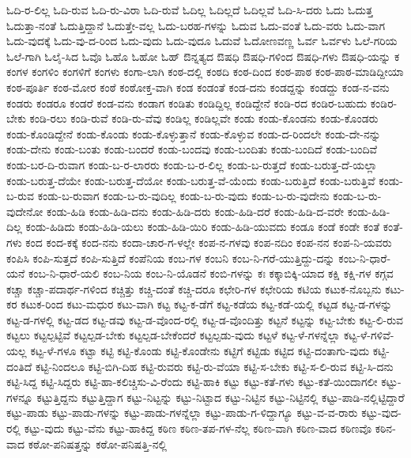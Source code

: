 {ಓದಿ-ರ-ಲಿಲ್ಲ
ಓದಿ-ರುವ
ಓದಿ-ರು-ವಿರಾ
ಓದಿ-ರುವೆ
ಓದಿಲ್ಲ
ಓದಿಲ್ಲದೆ
ಓದಿಲ್ಲವೆ
ಓದಿ-ಸಿ-ದರು
ಓದು
ಓದುತ್ತ
ಓದುತ್ತಾ-ನಂತೆ
ಓದುತ್ತಿದ್ದಾನೆ
ಓದುತ್ತೇ-ವಲ್ಲ
ಓದು-ಬರಹ-ಗಳನ್ನು
ಓದುವ
ಓದು-ವಂತೆ
ಓದು-ವರು
ಓದು-ವಾಗ
ಓದು-ವುದಕ್ಕೆ
ಓದು-ವು-ದ-ರಿಂದ
ಓದು-ವುದು
ಓದು-ವುದೂ
ಓದುವೆ
ಓದೋಣವಣ್ಣ
ಓರ್ವ
ಓರ್ವಳು
ಓಲೆ-ಗರಿಯ
ಓಲೆ-ಗಾಗಿ
ಓಲೈ-ಸಿದ
ಓವೊ
ಓಹೊ
ಓಹೋ
ಓಹ್
ಔನ್ನತ್ಯದ
ಔಷಧಿ
ಔಷಧಿ-ಗಳಿಂದ
ಔಷಧಿ-ಗಳು
ಔಷಧಿ-ಯನ್ನು
ಕ
ಕಂಗಳ
ಕಂಗಳಿಂ
ಕಂಗಳಿಗೆ
ಕಂಗಳು
ಕಂಗಾ-ಲಾಗಿ
ಕಂಠ-ದಲ್ಲಿ
ಕಂಠದಿ
ಕಂಠ-ದಿಂದ
ಕಂಠ-ಪಾಠ
ಕಂಠ-ಪಾಠ-ಮಾಡಿದ್ದೀಯಾ
ಕಂಠ-ಪೂರ್ತಿ
ಕಂಠ-ಮೋರ
ಕಂಠೆ
ಕಂಠೋಕ್ತ-ವಾಗಿ
ಕಂಡ
ಕಂಡಂತೆ
ಕಂಡ-ದನು
ಕಂಡದ್ದನ್ನು
ಕಂಡದ್ದು
ಕಂಡ-ನ-ವನು
ಕಂಡರು
ಕಂಡರೂ
ಕಂಡರೆ
ಕಂಡ-ವನು
ಕಂಡಾಗ
ಕಂಡಿತು
ಕಂಡಿದ್ದಿಲ್ಲ
ಕಂಡಿದ್ದೇನೆ
ಕಂಡಿ-ರದ
ಕಂಡಿರ-ಬಹುದು
ಕಂಡಿರ-ಬೇಕು
ಕಂಡಿ-ರಲು
ಕಂಡಿ-ರುವೆ
ಕಂಡಿ-ರು-ವೆವು
ಕಂಡಿಲ್ಲ
ಕಂಡಿಲ್ಲವೇ
ಕಂಡು
ಕಂಡು-ಕೊಂಡನು
ಕಂಡು-ಕೊಂಡರು
ಕಂಡು-ಕೊಂಡಿದ್ದೇನೆ
ಕಂಡು-ಕೊಂಡು
ಕಂಡು-ಕೊಳ್ಳುತ್ತಾನೆ
ಕಂಡು-ಕೊಳ್ಳುವ
ಕಂಡು-ದ-ರಿಂದಲೇ
ಕಂಡು-ದೇ-ನನ್ನು
ಕಂಡು-ದೇನು
ಕಂಡು-ಬಂತು
ಕಂಡು-ಬಂದರೆ
ಕಂಡು-ಬಂದವು
ಕಂಡು-ಬಂದಿತು
ಕಂಡು-ಬಂದಿದೆ
ಕಂಡು-ಬಂದಿವೆ
ಕಂಡು-ಬರ-ದಿ-ರುವಾಗ
ಕಂಡು-ಬ-ರ-ಲಾರರು
ಕಂಡು-ಬ-ರ-ಲಿಲ್ಲ
ಕಂಡು-ಬ-ರುತ್ತದೆ
ಕಂಡು-ಬರುತ್ತ-ದೆ-ಯಲ್ಲಾ
ಕಂಡು-ಬರುತ್ತ-ದೆಯೇ
ಕಂಡು-ಬರುತ್ತ-ದೆಯೋ
ಕಂಡು-ಬರುತ್ತ-ವೆ-ಯೆಂದು
ಕಂಡು-ಬರುತ್ತಿದೆ
ಕಂಡು-ಬರುತ್ತಿವೆ
ಕಂಡು-ಬ-ರುವ
ಕಂಡು-ಬ-ರುವಾಗ
ಕಂಡು-ಬ-ರು-ವುದಿಲ್ಲ
ಕಂಡು-ಬ-ರು-ವುದು
ಕಂಡು-ಬ-ರು-ವುದೇನು
ಕಂಡು-ಬ-ರು-ವುದೇನೋ
ಕಂಡು-ಹಿಡಿ
ಕಂಡು-ಹಿಡಿ-ದನು
ಕಂಡು-ಹಿಡಿ-ದರು
ಕಂಡು-ಹಿಡಿ-ದರೆ
ಕಂಡು-ಹಿಡಿ-ದ-ವರೇ
ಕಂಡು-ಹಿಡಿ-ದಿಲ್ಲ
ಕಂಡು-ಹಿಡಿದು
ಕಂಡು-ಹಿಡಿ-ಯಲು
ಕಂಡು-ಹಿಡಿ-ಯಿರಿ
ಕಂಡು-ಹಿಡಿ-ಯುವದು
ಕಂಡೂ
ಕಂಡೆ
ಕಂಡೇ
ಕಂತೆ
ಕಂತೆ-ಗಳು
ಕಂದ
ಕಂದ-ಕಕ್ಕೆ
ಕಂದ-ನನು
ಕಂದಾ-ಚಾರ-ಗ-ಳಲ್ಲೇ
ಕಂಪ-ನ-ಗಳವು
ಕಂಪ-ನದಿಂ
ಕಂಪ-ನನ
ಕಂಪ-ನಿ-ಯವರು
ಕಂಪಿಸಿ
ಕಂಪಿ-ಸುತ್ತದೆ
ಕಂಪಿ-ಸುತ್ತಿದೆ
ಕಂಪೆನಿಯ
ಕಂಬ-ಗಳ
ಕಂಬನಿ
ಕಂಬ-ನಿ-ಗರೆ-ಯುತ್ತಿದ್ದು-ದನ್ನು
ಕಂಬ-ನಿ-ಧಾರೆ-ಯನೆ
ಕಂಬ-ನಿ-ಧಾರೆ-ಯಲಿ
ಕಂಬ-ನಿಯ
ಕಂಬ-ನಿ-ಯೊಡನೆ
ಕಂಬಿ-ಗಳನ್ನು
ಕಃ
ಕಕ್ಕಾಬಿಕ್ಕಿ-ಯಾದ
ಕಕ್ಷಿ
ಕಕ್ಷಿ-ಗಳ
ಕಗ್ಗವ
ಕಚ್ಚಾ
ಕಚ್ಚಾ-ಪದಾರ್ಥ-ಗಳಿಂದ
ಕಚ್ಚಿತ್ತು
ಕಚ್ಚಿ-ದಂತೆ
ಕಚ್ಚಿ-ದರೂ
ಕಛೇರಿ-ಗಳ
ಕಛೇರಿಯ
ಕಟಿಯ
ಕಟುಕ-ನೊಬ್ಬನು
ಕಟು-ಕರ
ಕಟುಕ-ರಿಂದ
ಕಟು-ಮಧುರ
ಕಟು-ವಾಗಿ
ಕಟ್ಟ
ಕಟ್ಟ-ಕ-ಡೆಗೆ
ಕಟ್ಟ-ಕಡೆಯ
ಕಟ್ಟ-ಕಡೆ-ಯಲ್ಲಿ
ಕಟ್ಟಡ
ಕಟ್ಟ-ಡ-ಗಳನ್ನು
ಕಟ್ಟ-ಡ-ಗಳಲ್ಲಿ
ಕಟ್ಟ-ಡದ
ಕಟ್ಟ-ಡವು
ಕಟ್ಟ-ಡ-ವೊಂದ-ರಲ್ಲಿ
ಕಟ್ಟ-ಡ-ವೊಂದಿತ್ತು
ಕಟ್ಟನೆ
ಕಟ್ಟನ್ನು
ಕಟ್ಟ-ಬೇಕು
ಕಟ್ಟ-ಲಿ-ರುವ
ಕಟ್ಟಲು
ಕಟ್ಟಲ್ಪಟ್ಟಿವೆ
ಕಟ್ಟಲ್ಪಡ-ಬೇಕು
ಕಟ್ಟಲ್ಪಡ-ಬೇಕೆಂದರೆ
ಕಟ್ಟಲ್ಪಡು-ವುದು
ಕಟ್ಟಳೆ
ಕಟ್ಟ-ಳೆ-ಗಳನ್ನೆಲ್ಲಾ
ಕಟ್ಟ-ಳೆ-ಗಳಿವೆ-ಯಲ್ಲ
ಕಟ್ಟ-ಳೆ-ಗಳೂ
ಕಟ್ಟಾ
ಕಟ್ಟಿ
ಕಟ್ಟಿ-ಕೊಂಡು
ಕಟ್ಟಿ-ಕೊಂಡೇನು
ಕಟ್ಟಿಗೆ
ಕಟ್ಟಿಡು
ಕಟ್ಟಿದ
ಕಟ್ಟಿ-ದಂತಾಗು-ವುದು
ಕಟ್ಟಿ-ದಂತಿದೆ
ಕಟ್ಟಿ-ನಿಂದಲೂ
ಕಟ್ಟಿ-ಬಿಗಿ-ದಿಹ
ಕಟ್ಟಿ-ರುವರು
ಕಟ್ಟಿ-ರು-ವೆಯಾ
ಕಟ್ಟಿ-ಸ-ಬೇಕು
ಕಟ್ಟಿ-ಸ-ಲಿ-ರುವ
ಕಟ್ಟಿ-ಸಿ-ದನು
ಕಟ್ಟಿ-ಸಿದ್ದ
ಕಟ್ಟಿ-ಸಿದ್ದರು
ಕಟ್ಟಿ-ಹಾ-ಕಲಿಚ್ಚಿಸು-ವಿ-ರೆಂದು
ಕಟ್ಟಿ-ಹಾಕಿ
ಕಟ್ಟು
ಕಟ್ಟು-ಕತೆ-ಗಳು
ಕಟ್ಟು-ಕತೆ-ಯಿಂದಾಗಲೀ
ಕಟ್ಟು-ಗಳನ್ನೂ
ಕಟ್ಟುತ್ತಿದ್ದನು
ಕಟ್ಟುತ್ತಿದ್ದಾಗ
ಕಟ್ಟು-ನಿಟ್ಟನ್ನು
ಕಟ್ಟು-ನಿಟ್ಟಾದ
ಕಟ್ಟು-ನಿಟ್ಟಿನ
ಕಟ್ಟು-ನಿಟ್ಟಿನಲ್ಲಿ
ಕಟ್ಟು-ಪಾಡಿ-ನಲ್ಲಿಟ್ಟಿದ್ದಾರೆ
ಕಟ್ಟು-ಪಾಡು
ಕಟ್ಟು-ಪಾಡು-ಗಳನ್ನು
ಕಟ್ಟು-ಪಾಡು-ಗಳನ್ನೆಲ್ಲಾ
ಕಟ್ಟು-ಪಾಡು-ಗ-ಳಿದ್ದಾಗ್ಯೂ
ಕಟ್ಟು-ವ-ವ-ರಾರು
ಕಟ್ಟು-ವುದ-ರಲ್ಲಿ
ಕಟ್ಟು-ವುದು
ಕಟ್ಟು-ವೆನು
ಕಟ್ಟು-ಹಾಕಿದ್ದ
ಕಠಿಣ
ಕಠಿಣ-ತಪ-ಗಳ-ನೆಲ್ಲ
ಕಠಿಣ-ವಾಗಿ
ಕಠಿಣ-ವಾದ
ಕಠಿಣವೊ
ಕಠಿನ-ವಾದ
ಕಠೋ-ಪನಿಷತ್ತನ್ನು
ಕಠೋ-ಪನಿಷತ್ತಿ-ನಲ್ಲಿ
}

